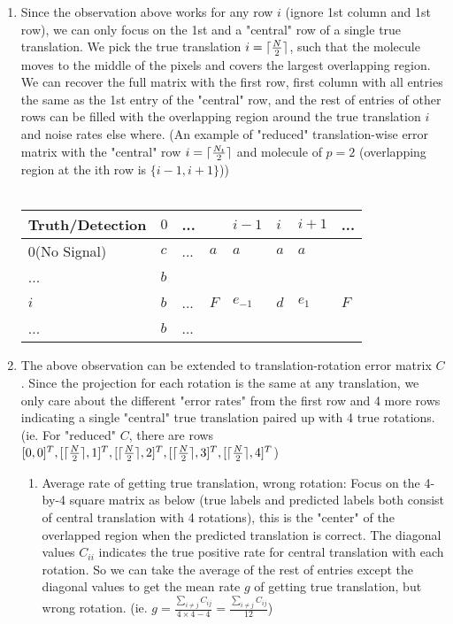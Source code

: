 \documentclass[11pt]{article}
\DeclarePairedDelimiter{\ceil}{\lceil}{\rceil}
\begin{document}
\begin{enumerate}
            \item Since the observation above works for any row $i$ (ignore 1st column and 1st row), we can only focus on the 1st and a "central" row of a single true translation. We pick the true translation $i=\ceil{\frac{N}{2}}$, such that the molecule moves to the middle of the pixels and covers the largest overlapping region. We can recover the full matrix with the first row, first column with all entries the same as the 1st entry of the "central" row, and the rest of entries of other rows can be filled with the overlapping region around the true translation $i$ and noise rates else where. (An example of "reduced" translation-wise error matrix with the "central" row $i=\ceil{\frac{N_t}{2}}$ and molecule of $p=2$ (overlapping region at the ith row is $\{i-1,i+1\}$))
            \\\\
            \begin{tabular}{l|l|l|l|l|l|l|l}
            Truth/Detection&$0$&...& &$i-1$&$i$&$i+1$&...\\\hline
            $0$(No Signal)&$c$&... &$a$&$a$&$a$&$a$& \\\hline
            ...&$b$& & & & & & \\\hline
            $i$&$b$&...&$F$ &$e_{-1}$&$d$&$e_{1}$&$F$\\\hline
            ...&$b$&...& & & & & \\\hline
            
            \end{tabular}
            
            \item The above observation can be extended to translation-rotation error matrix $C$. Since the projection for each rotation is the same at any translation, we only care about the different "error rates" from the first row and 4 more rows indicating a single "central" true translation paired up with 4 true rotations. \\ (ie. For "reduced" $C$, there are rows $[0, 0]^T, [\ceil{\frac{N}{2}}, 1]^T, [\ceil{\frac{N}{2}}, 2]^T, [\ceil{\frac{N}{2}}, 3]^T, [\ceil{\frac{N}{2}}, 4]^T$)
            \begin{enumerate}
                \item Average rate of getting true translation, wrong rotation: Focus on the 4-by-4 square matrix as below (true labels and predicted labels both consist of central translation with 4 rotations), this is the "center" of the overlapped region when the predicted translation is correct. The diagonal values $C_{ii}$ indicates the true positive rate for central translation with each rotation. So we can take the average of the rest of entries except the diagonal values to get the mean rate $g$ of getting true translation, but wrong rotation. (ie. $g = \frac{\sum_{i \neq j} C_{ij}}{4\times 4-4}=\frac{\sum_{i \neq j} C_{ij}}{12}$)
                

\end{enumerate}
\end{enumerate}
\end{document}
